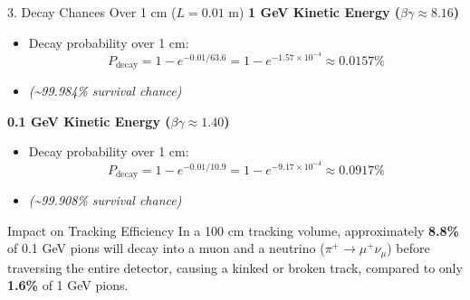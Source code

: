 \documentclass[aspectratio=169]{beamer}
\begin{document}
\begin{frame}{3. Decay Chances Over 1 cm ($L = 0.01 \text{ m}$)}
    \textbf{1 GeV Kinetic Energy ($\beta\gamma \approx 8.16$)}
    \begin{itemize}
        \item Decay probability over 1 cm:
        \[ P_{\text{decay}} = 1 - e^{-0.01/63.6} = 1 - e^{-1.57\times10^{-4}} \approx 0.0157\% \]
        \item \textit{(\textasciitilde 99.984\% survival chance)}
    \end{itemize}
    \vspace{0.6em}
    \textbf{0.1 GeV Kinetic Energy ($\beta\gamma \approx 1.40$)}
    \begin{itemize}
        \item Decay probability over 1 cm:
        \[ P_{\text{decay}} = 1 - e^{-0.01/10.9} = 1 - e^{-9.17\times10^{-4}} \approx 0.0917\% \]
        \item \textit{(\textasciitilde 99.908\% survival chance)}
    \end{itemize}
\end{frame}

\begin{frame}{Impact on Tracking Efficiency}
    In a 100 cm tracking volume, approximately \textbf{8.8\%} of 0.1 GeV pions will decay into a muon and a neutrino ($\pi^+ \to \mu^+\nu_\mu$) before traversing the entire detector, causing a kinked or broken track, compared to only \textbf{1.6\%} of 1 GeV pions.
\end{frame}
\end{document}
